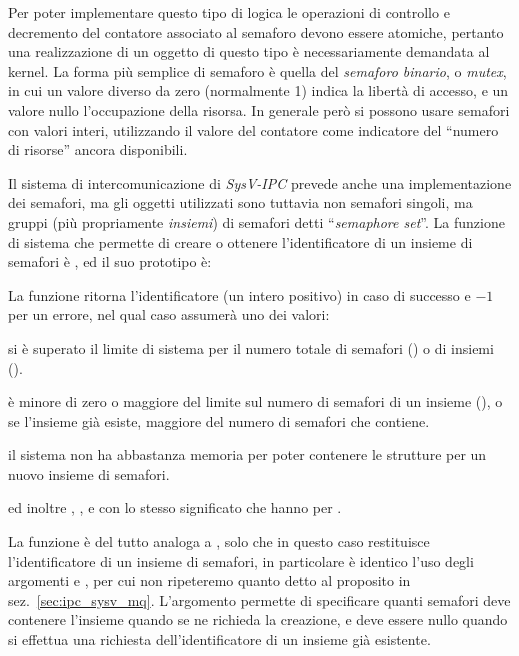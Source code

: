Per poter implementare questo tipo di logica le operazioni di controllo e
decremento del contatore associato al semaforo devono essere atomiche,
pertanto una realizzazione di un oggetto di questo tipo è necessariamente
demandata al kernel. La forma più semplice di semaforo è quella del
\textsl{semaforo binario}, o \textit{mutex}, in cui un valore diverso da zero
(normalmente 1) indica la libertà di accesso, e un valore nullo l'occupazione
della risorsa. In generale però si possono usare semafori con valori interi,
utilizzando il valore del contatore come indicatore del ``numero di risorse''
ancora disponibili.

Il sistema di intercomunicazione di \textit{SysV-IPC} prevede anche una
implementazione dei semafori, ma gli oggetti utilizzati sono tuttavia non
semafori singoli, ma gruppi (più propriamente \textsl{insiemi}) di semafori
detti ``\textit{semaphore set}''. La funzione di sistema che permette di
creare o ottenere l'identificatore di un insieme di semafori è ,
ed il suo prototipo è:

\begin{funcproto}{
}

{La funzione ritorna l'identificatore (un intero positivo) in caso di successo
  e $-1$ per un errore, nel qual caso  assumerà uno dei valori:
  \begin{errlist}
  \item[\errcode{ENOSPC}] si è superato il limite di sistema per il numero
    totale di semafori () o di insiemi ().
  \item[\errcode{EINVAL}]  è minore di zero o maggiore del limite
    sul numero di semafori di un insieme (), o se l'insieme già
    esiste, maggiore del numero di semafori che contiene.
  \item[\errcode{ENOMEM}] il sistema non ha abbastanza memoria per poter
    contenere le strutture per un nuovo insieme di semafori.
  \end{errlist}
  ed inoltre , ,  e
   con lo stesso significato che hanno per .}
\end{funcproto}

La funzione è del tutto analoga a , solo che in questo caso
restituisce l'identificatore di un insieme di semafori, in particolare è
identico l'uso degli argomenti  e , per cui non
ripeteremo quanto detto al proposito in sez.~\ref{sec:ipc_sysv_mq}. L'argomento
 permette di specificare quanti semafori deve contenere l'insieme
quando se ne richieda la creazione, e deve essere nullo quando si effettua una
richiesta dell'identificatore di un insieme già esistente.

